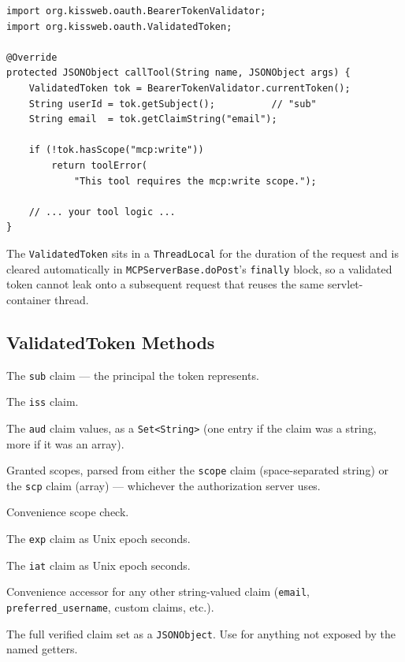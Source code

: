 \begin{lstlisting}[style=java]
import org.kissweb.oauth.BearerTokenValidator;
import org.kissweb.oauth.ValidatedToken;

@Override
protected JSONObject callTool(String name, JSONObject args) {
    ValidatedToken tok = BearerTokenValidator.currentToken();
    String userId = tok.getSubject();          // "sub"
    String email  = tok.getClaimString("email");

    if (!tok.hasScope("mcp:write"))
        return toolError(
            "This tool requires the mcp:write scope.");

    // ... your tool logic ...
}
\end{lstlisting}

\noindent
The \texttt{ValidatedToken} sits in a \texttt{ThreadLocal} for the duration of the request and is cleared automatically in \texttt{MCPServerBase.doPost}'s \texttt{finally} block, so a validated token cannot leak onto a subsequent request that reuses the same servlet-container thread.

\subsection{ValidatedToken Methods}

\begin{description}[style=nextline]
  \item[\texttt{getSubject()}] The \texttt{sub} claim --- the principal the token represents.
  \item[\texttt{getIssuer()}] The \texttt{iss} claim.
  \item[\texttt{getAudience()}] The \texttt{aud} claim values, as a \texttt{Set<String>} (one entry if the claim was a string, more if it was an array).
  \item[\texttt{getScopes()}] Granted scopes, parsed from either the \texttt{scope} claim (space-separated string) or the \texttt{scp} claim (array) --- whichever the authorization server uses.
  \item[\texttt{hasScope(String)}] Convenience scope check.
  \item[\texttt{getExpiresAtEpochSeconds()}] The \texttt{exp} claim as Unix epoch seconds.
  \item[\texttt{getIssuedAtEpochSeconds()}] The \texttt{iat} claim as Unix epoch seconds.
  \item[\texttt{getClaimString(String)}] Convenience accessor for any other string-valued claim (\texttt{email}, \texttt{preferred\_username}, custom claims, etc.).
  \item[\texttt{getClaims()}] The full verified claim set as a \texttt{JSONObject}.  Use for anything not exposed by the named getters.
\end{description}

